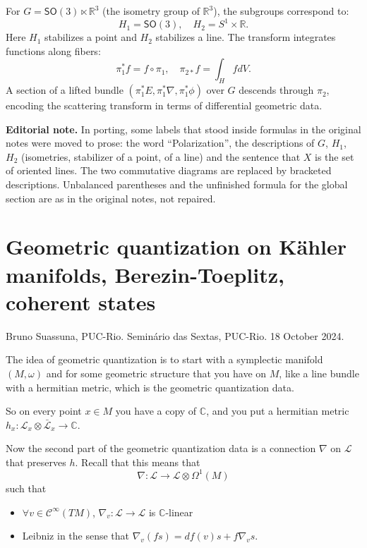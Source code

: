 For $G = \mathsf{SO}(3) \ltimes \mathbb{R}^3$
(the isometry group of $\mathbb{R}^3$), the
subgroups correspond to:
$$
H_1 = \mathsf{SO}(3), \quad H_2 = S^1 \times
\mathbb{R}.
$$
Here $H_1$ stabilizes a point and $H_2$
stabilizes a line. The transform integrates
functions along fibers:
$$
\pi_1^* f = f \circ \pi_1, \quad \pi_{2*} f =
\int_H f dV.
$$
A section of a lifted bundle $(\pi_1^*E,
\pi_1^*\nabla, \pi_1^*\phi)$ over $G$
descends through $\pi_2$, encoding the
scattering transform in terms of differential
geometric data.

\medskip\noindent
{\bf Editorial note.} In porting, some
labels that stood inside formulas in the
original notes were moved to prose: the
word ``Polarization'', the descriptions of
$G$, $H_1$, $H_2$ (isometries, stabilizer of
a point, of a line) and the sentence that
$X$ is the set of oriented lines. The two
commutative diagrams are replaced by
bracketed descriptions. Unbalanced
parentheses and the unfinished formula
for the global section are as in the
original notes, not repaired.

\section{Geometric quantization on K\"ahler
manifolds, Berezin-Toeplitz, coherent
states}
\label{section-geometric-quantization-kahler}

\noindent
Bruno Suassuna, PUC-Rio.
Seminário das Sextas, PUC-Rio.
18 October 2024.

\medskip
The idea of geometric quantization is to
start with a symplectic manifold $(M,\omega)$
and for some geometric structure that you
have on $M$, like a line bundle with a
hermitian metric, which is the geometric
quantization data.

So on every point $x \in M$ you have a copy
of $\mathbb{C}$, and you put a hermitian
metric $h_x:\mathcal{L}_x\otimes
\bar{\mathcal{L}}_x\to \mathbb{C}$.

Now the second part of the geometric
quantization data is a connection $\nabla$ on
$\mathcal{L}$ that preserves $h$. Recall that
this means that
$$
\nabla :\mathcal{L}\to \mathcal{L}\otimes
\Omega^{1}(M)
$$
such that
\begin{itemize}
\item $\forall v\in\mathcal{C}^\infty(TM)$,
$\nabla_v:\mathcal{L}\to \mathcal{L}$ is
$\mathbb{C}$-linear
\item Leibniz in the sense that
$\nabla_v(fs)=df(v)s+f \nabla_vs$.
\end{itemize}

